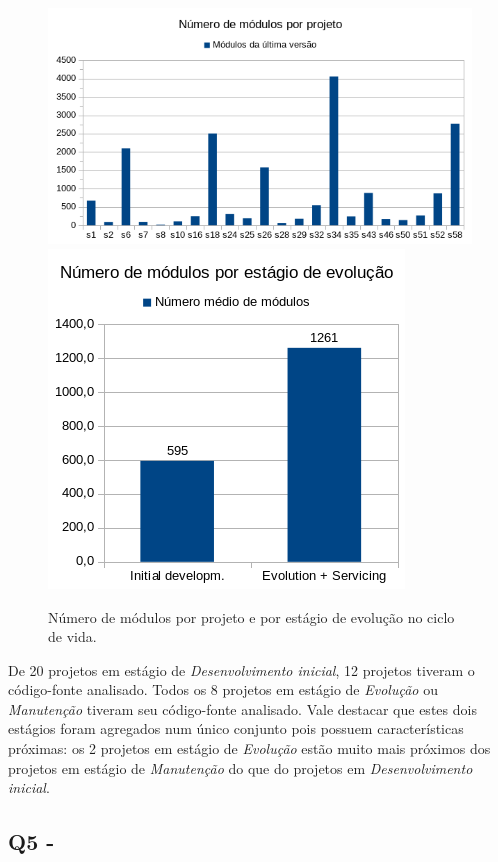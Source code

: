 \begin{figure}[ht]
  \center
  \includegraphics[scale=0.6]{imagens/modules-total.png}
  \includegraphics[scale=0.6]{imagens/modules-average.png}
  \caption{Número de módulos por projeto e por estágio de evolução no ciclo de vida.}
  \label{modules-average}
\end{figure}

De 20 projetos em estágio de {\it Desenvolvimento inicial}, 
12 projetos tiveram o código-fonte analisado. 
Todos os 8 projetos em estágio de {\it Evolução} ou {\it Manutenção}
tiveram seu código-fonte analisado.
Vale destacar que estes dois estágios foram agregados num único conjunto 
pois possuem características próximas: 
os 2 projetos em estágio de {\it Evolução} estão
muito mais próximos dos projetos em estágio de {\it Manutenção} do que 
do projetos em {\it Desenvolvimento inicial}. 

\subsection{Q5 - \QuestaoCinco} %

